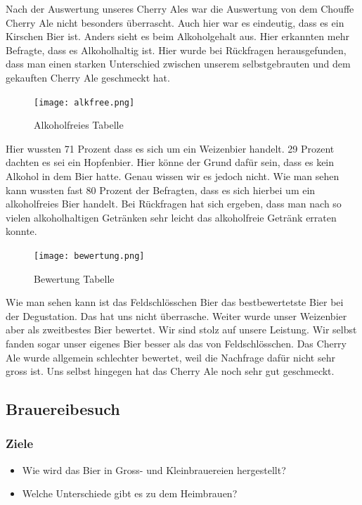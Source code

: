 Nach der Auswertung unseres Cherry Ales war die Auswertung von dem Chouffe Cherry Ale nicht besonders überrascht. Auch hier war es eindeutig, dass es ein Kirschen Bier ist. Anders sieht es beim Alkoholgehalt aus. Hier erkannten mehr Befragte, dass es Alkoholhaltig ist. Hier wurde bei Rückfragen herausgefunden, dass man einen starken Unterschied zwischen unserem selbstgebrauten und dem gekauften Cherry Ale geschmeckt hat.
\begin{figure}[!h]
	\centering
	\texttt{[image: alkfree.png]}
	\caption{Alkoholfreies Tabelle}
\end{figure}
Hier wussten 71 Prozent
dass es sich um ein Weizenbier handelt. 29 Prozent dachten es sei ein Hopfenbier. Hier könne der Grund dafür sein, dass es kein Alkohol in dem Bier hatte. Genau wissen wir es jedoch nicht. Wie man sehen kann wussten fast 80 Prozent der Befragten, dass es sich hierbei um ein alkoholfreies Bier handelt. Bei Rückfragen hat sich ergeben, dass man nach so vielen alkoholhaltigen Getränken sehr leicht das alkoholfreie Getränk erraten konnte. 
 
\begin{figure}[!h]
	\centering
	\texttt{[image: bewertung.png]}
	\caption{Bewertung Tabelle}
\end{figure}
Wie man sehen kann ist das Feldschlösschen Bier das bestbewertetste Bier bei der Degustation. Das hat uns nicht überrasche. Weiter wurde unser Weizenbier aber als zweitbestes Bier bewertet. Wir sind stolz auf unsere Leistung. Wir selbst fanden sogar unser eigenes Bier besser als das von Feldschlösschen. Das Cherry Ale wurde allgemein schlechter bewertet, weil die Nachfrage dafür nicht sehr gross ist. Uns selbst hingegen hat das Cherry Ale noch sehr gut geschmeckt. 

\newpage
\subsection{Brauereibesuch}
\subsubsection{Ziele}
\begin{itemize}
  \item Wie wird das Bier in Gross- und Kleinbrauereien hergestellt?
  \item Welche Unterschiede gibt es zu dem Heimbrauen?
\end{itemize}



